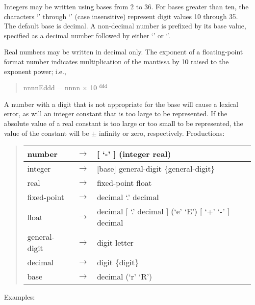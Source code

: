 \documentclass[letterpaper,10pt,english]{sphinxmanual}
\begin{document}
Integers may be written using bases from 2 to 36. For bases greater than ten, the characters ‘’
through ‘’ (case insensitive) represent digit values 10 through 35. The default base is decimal. A
non-decimal number is prefixed by its base value, specified as a decimal number followed by either
‘’ or ‘’.

Real numbers may be written in decimal only. The exponent of a floating-point format number indicates
multiplication of the mantissa by 10 raised to the exponent power; i.e.,
\begin{quote}

nnnnEddd = nnnn × 10 $^{\text{ddd}}$
\end{quote}

A number with a digit that is not appropriate for the base will cause a lexical error, as will an integer
constant that is too large to be represented. If the absolute value of a real constant is too large
or too small to be represented, the value of the constant will be \(\pm\) infinity or zero, respectively.
\newpage
Productions:
\begin{quote}

\noindent\begin{tabulary}{\linewidth}{|L|L|L|}
\hline

number
&
\(\rightarrow\)
&
{[} ‘-’ {]} (integer \textbar{} real)
\\
\hline
integer
&
\(\rightarrow\)
&
{[}base{]} general-digit \{general-digit\}
\\
\hline
real
&
\(\rightarrow\)
&
fixed-point \textbar{} float
\\
\hline
fixed-point
&
\(\rightarrow\)
&
decimal ‘.’ decimal
\\
\hline
float
&
\(\rightarrow\)
&
decimal {[} ‘.’ decimal {]} (‘e’ \textbar{} ‘E’) {[} ‘+’ \textbar{} ‘-’ {]} decimal
\\
\hline
general-digit
&
\(\rightarrow\)
&
digit \textbar{} letter
\\
\hline
decimal
&
\(\rightarrow\)
&
digit \{digit\}
\\
\hline
base
&
\(\rightarrow\)
&
decimal (‘r’ \textbar{} ‘R’)
\\
\hline\end{tabulary}

\end{quote}

Examples:
\begin{quote}

\end{quote}
\end{document}
